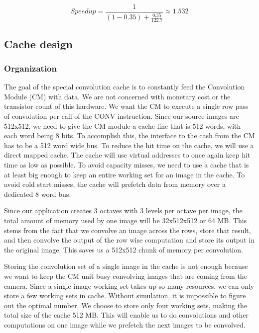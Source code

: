 \begin{equation*}
Speedup =\frac{1}{(1-0.35) + \frac{0.35}{122.7}} \approx 1.532
\end{equation*}


\subsection{Cache design}
\subsubsection{Organization}
The goal of the special convolution cache is to constantly feed the Convolution Module (CM) with data. We are not concerned with monetary cost or the transistor count of this hardware. We want the CM to execute a single row pass of convolution per call of the CONV instruction. Since our source images are 512x512, we need to give the CM module a cache line that is 512 words, with each word being 8 bits. To accomplish this, the interface to the cash from the CM has to be a 512 word wide bus. To reduce the hit time on the cache, we will use a direct mapped cache. The cache will use virtual addresses to once again keep hit time as low as possible. To avoid capacity misses, we need to use a cache that is at least big enough to keep an entire working set for an image in the cache. To avoid cold start misses, the cache will prefetch data from memory over a dedicated 8 word bus.

Since our application creates 3 octaves with 3 levels per octave per image, the total amount of memory used by one image will be 32x512x512 or 64 MB. This stems from the fact that we convolve an image across the rows, store that result, and then convolve the output of the row wise computation and store its output in the original image. This saves us a 512x512 chunk of memory per convolution.

Storing the convolution set of a single image in the cache is not enough because we want to keep the CM unit busy convolving images that are coming from the camera. Since a single image working set takes up so many resources, we can only store a few working sets in cache. Without simulation, it is impossible to figure out the optimal number. We choose to store only four working sets, making the total size of the cache 512 MB. This will enable us to do convolutions and other computations on one image while we prefetch the next images to be convolved.

